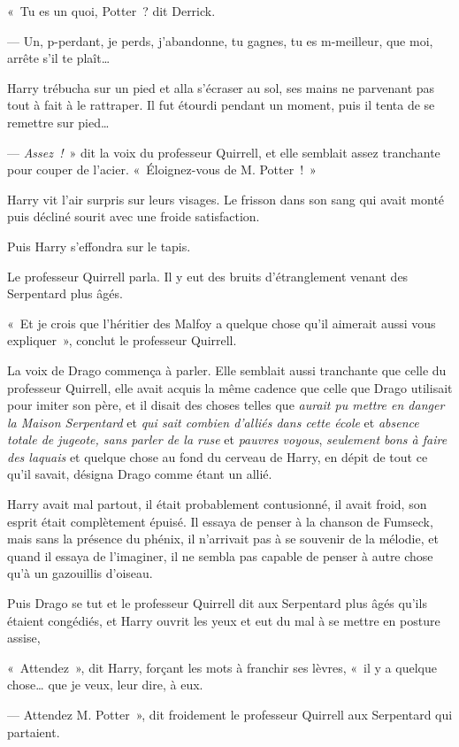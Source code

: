 «~Tu es un quoi, Potter~? dit Derrick.

--- Un, p-perdant, je perds, j'abandonne, tu gagnes, tu es m-meilleur, que moi, arrête s'il te plaît…

Harry trébucha sur un pied et alla s'écraser au sol, ses mains ne parvenant pas tout à fait à le rattraper. Il fut étourdi pendant un moment, puis il tenta de se remettre sur pied…

--- \emph{Assez~!}~» dit la voix du professeur Quirrell, et elle semblait assez tranchante pour couper de l'acier. «~Éloignez-vous de M. Potter~!~»

Harry vit l'air surpris sur leurs visages. Le frisson dans son sang qui avait monté puis décliné sourit avec une froide satisfaction.

Puis Harry s'effondra sur le tapis.

Le professeur Quirrell parla. Il y eut des bruits d'étranglement venant des Serpentard plus âgés.

«~Et je crois que l'héritier des Malfoy a quelque chose qu'il aimerait aussi vous expliquer~», conclut le professeur Quirrell.

La voix de Drago commença à parler. Elle semblait aussi tranchante que celle du professeur Quirrell, elle avait acquis la même cadence que celle que Drago utilisait pour imiter son père, et il disait des choses telles que \emph{aurait pu mettre en danger la Maison Serpentard} et \emph{qui sait combien d'alliés dans cette école} et \emph{absence totale de jugeote, sans parler de la ruse} et \emph{pauvres voyous}, \emph{seulement bons à faire des laquais} et quelque chose au fond du cerveau de Harry, en dépit de tout ce qu'il savait, désigna Drago comme étant un allié.

Harry avait mal partout, il était probablement contusionné, il avait froid, son esprit était complètement épuisé. Il essaya de penser à la chanson de Fumseck, mais sans la présence du phénix, il n'arrivait pas à se souvenir de la mélodie, et quand il essaya de l'imaginer, il ne sembla pas capable de penser à autre chose qu'à un gazouillis d'oiseau.

Puis Drago se tut et le professeur Quirrell dit aux Serpentard plus âgés qu'ils étaient congédiés, et Harry ouvrit les yeux et eut du mal à se mettre en posture assise,

«~Attendez~», dit Harry, forçant les mots à franchir ses lèvres, «~il y a quelque chose… que je veux, leur dire, à eux.

--- Attendez M. Potter~», dit froidement le professeur Quirrell aux Serpentard qui partaient.

